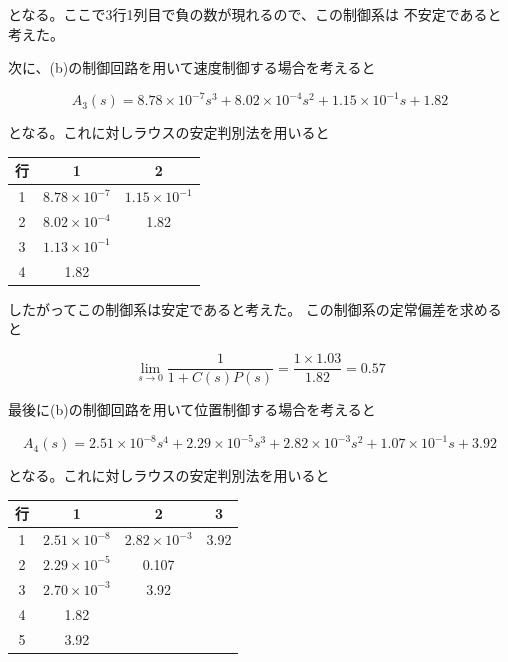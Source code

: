 \documentclass[uplatex, 11pt,a4j, titlepage]{jsarticle}
\begin{document}
となる。ここで3行1列目で負の数が現れるので、この制御系は
不安定であると考えた。

次に、(b)の制御回路を用いて速度制御する場合を考えると

\begin{equation}
    A_3(s) = 8.78\times10^{-7}s^3 + 8.02\times10^{-4}s^2 
        + 1.15\times10^{-1}s + 1.82
\end{equation}

となる。これに対しラウスの安定判別法を用いると

\begin{table}[h]
    \centering
    \begin{tabular}{|c||c|c|} \hline
        行 & 1 & 2 \\ \hline \hline
        1 & $8.78\times10^{-7}$ & $1.15\times10^{-1}$ \\ \hline
        2 & $8.02\times10^{-4}$ & 1.82 \\ \hline
        3 & $1.13\times10^{-1}$ & \  \\ \hline
        4 & 1.82 & \  \\ \hline
    \end{tabular}
\end{table}

したがってこの制御系は安定であると考えた。
この制御系の定常偏差を求めると

\begin{equation}
    \lim_{s \to 0}\frac{1}{1+C(s)P(s)} 
        = \frac{1\times1.03}{1.82} = 0.57 
\end{equation}

最後に(b)の制御回路を用いて位置制御する場合を考えると

\begin{equation}
    A_4(s) = 2.51\times10^{-8} s^4 + 2.29\times10^{-5}s^3 
        + 2.82\times10^{-3}s^2 
        + 1.07\times10^{-1}s + 3.92
\end{equation}

となる。これに対しラウスの安定判別法を用いると

\begin{table}[h]
    \centering
    \begin{tabular}{|c||c|c|c|} \hline
        行 & 1 & 2 & 3 \\ \hline \hline
        1 & $2.51\times10^{-8}$ & $2.82\times10^{-3}$ & 3.92 \\ \hline
        2 & $2.29\times10^{-5}$ & 0.107 & \  \\ \hline
        3 & $2.70\times10^{-3}$ & 3.92 & \  \\ \hline
        4 & 1.82 & \ & \  \\ \hline
        5 & 3.92 & \ & \ \\ \hline
    \end{tabular}
\end{table}
\end{document}
